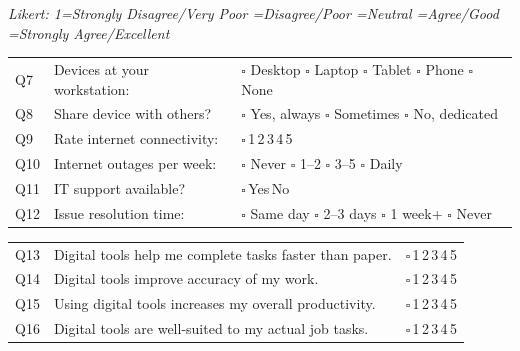 \documentclass[10pt,a4paper]{article}
\newcommand{\likert}{{\Large$\square$}\,1\quad{\Large$\square$}\,2\quad{\Large$\square$}\,3\quad{\Large$\square$}\,4\quad{\Large$\square$}\,5}
\newcommand{\yesno}{{\Large$\square$}\,Yes\quad{\Large$\square$}\,No}
\begin{document}
\vspace{4pt}
\vspace{2pt}

\small\textit{Likert: 1=Strongly Disagree/Very Poor =Disagree/Poor =Neutral =Agree/Good =Strongly Agree/Excellent}\normalsize\vspace{4pt}

\noindent\begin{tabularx}{\textwidth}{@{}L{0.6cm} X L{5.5cm}@{}}
Q7 & Devices at your workstation: & {\Large$\square$} Desktop {\Large$\square$} Laptop {\Large$\square$} Tablet {\Large$\square$} Phone {\Large$\square$} None \\[3pt]
Q8 & Share device with others? & {\Large$\square$} Yes, always {\Large$\square$} Sometimes {\Large$\square$} No, dedicated \\[3pt]
Q9 & Rate internet connectivity: & \likert \\[3pt]
Q10 & Internet outages per week: & {\Large$\square$} Never {\Large$\square$} 1--2 {\Large$\square$} 3--5 {\Large$\square$} Daily \\[3pt]
Q11 & IT support available? & \yesno \\[3pt]
Q12 & Issue resolution time: & {\Large$\square$} Same day {\Large$\square$} 2--3 days {\Large$\square$} 1 week+ {\Large$\square$} Never \\
\end{tabularx}

\vspace{4pt}
\vspace{4pt}

\noindent\begin{tabularx}{\textwidth}{@{}L{0.6cm} X L{5.5cm}@{}}
Q13 & Digital tools help me complete tasks faster than paper. & \likert \\[3pt]
Q14 & Digital tools improve accuracy of my work. & \likert \\[3pt]
Q15 & Using digital tools increases my overall productivity. & \likert \\[3pt]
Q16 & Digital tools are well-suited to my actual job tasks. & \likert \\
\end{tabularx}

\vspace{4pt}
\vspace{4pt}
\end{document}

